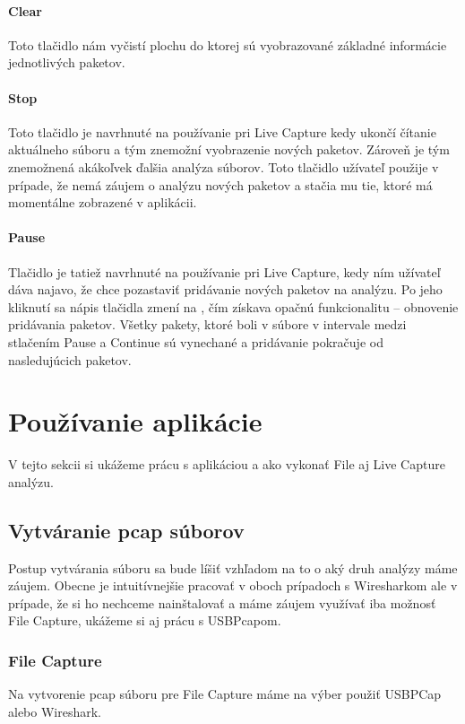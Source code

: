 \paragraph{Clear}
\hfill\break
Toto tlačidlo nám vyčistí plochu do ktorej sú vyobrazované základné informácie jednotlivých paketov.

\paragraph{Stop}
\hfill\break
Toto tlačidlo je navrhnuté na používanie pri Live Capture kedy ukončí čítanie aktuálneho súboru a tým znemožní vyobrazenie nových paketov. Zároveň je tým znemožnená akákoľvek ďalšia analýza súborov. Toto tlačidlo užívateľ použije v prípade, že nemá záujem o analýzu nových paketov a stačia mu tie, ktoré má momentálne zobrazené v aplikácii.

\paragraph{Pause}
\hfill\break
Tlačidlo je tatiež navrhnuté na používanie pri Live Capture, kedy ním užívateľ dáva najavo, že chce pozastaviť pridávanie nových paketov na analýzu. Po jeho kliknutí sa nápis tlačidla zmení na , čím získava opačnú funkcionalitu -- obnovenie pridávania paketov. Všetky pakety, ktoré boli v súbore v intervale medzi stlačením Pause a Continue sú vynechané a pridávanie pokračuje od nasledujúcich paketov.



\section{Používanie aplikácie}
V tejto sekcii si ukážeme prácu s aplikáciou a ako vykonať File aj Live Capture analýzu. 

\subsection{Vytváranie pcap súborov}
Postup vytvárania súboru sa bude líšiť vzhľadom na to o aký druh analýzy máme záujem. Obecne je intuitívnejšie pracovať v oboch prípadoch s Wiresharkom ale v prípade, že si ho nechceme nainštalovať a máme záujem využívať iba možnosť File Capture, ukážeme si aj prácu s USBPcapom.

\subsubsection{File Capture}
Na vytvorenie pcap súboru pre File Capture máme na výber použiť USBPCap alebo Wireshark.

